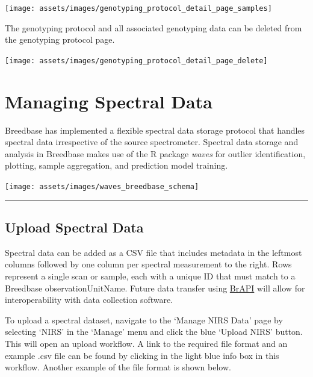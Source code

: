 \documentclass[
  12pt,
]{book}
\begin{document}
\begin{center}\texttt{[image: assets/images/genotyping\_protocol\_detail\_page\_samples]} \end{center}

The genotyping protocol and all associated genotyping data can be deleted from the genotyping protocol page.

\begin{center}\texttt{[image: assets/images/genotyping\_protocol\_detail\_page\_delete]} \end{center}

\hypertarget{managing-spectral-data}{%
\chapter{Managing Spectral Data}\label{managing-spectral-data}}

Breedbase has implemented a flexible spectral data storage protocol that handles spectral data irrespective of the source spectrometer. Spectral data storage and analysis in Breedbase makes use of the R package \emph{waves} for outlier identification, plotting, sample aggregation, and prediction model training.

\begin{center}\texttt{[image: assets/images/waves\_breedbase\_schema]} \end{center}

\begin{center}\rule{0.5\linewidth}{0.5pt}\end{center}

\hypertarget{upload-spectral-data}{%
\section{Upload Spectral Data}\label{upload-spectral-data}}

Spectral data can be added as a CSV file that includes metadata in the leftmost columns followed by one column per spectral measurement to the right. Rows represent a single scan or sample, each with a unique ID that must match to a Breedbase observationUnitName. Future data transfer using \href{https://brapi.org}{BrAPI} will allow for interoperability with data collection software.

To upload a spectral dataset, navigate to the `Manage NIRS Data' page by selecting `NIRS' in the `Manage' menu and click the blue `Upload NIRS' button. This will open an upload workflow. A link to the required file format and an example .csv file can be found by clicking in the light blue info box in this workflow. Another example of the file format is shown below.
\end{document}
